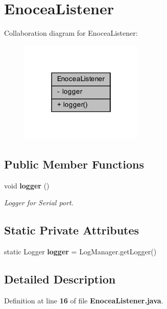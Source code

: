 \section{Enocea\+Listener}
\label{classch_1_1bfh_1_1gr33nopo55um_1_1enocean_1_1application_1_1EnoceaListener}


Collaboration diagram for Enocea\+Listener\+:\nopagebreak
\begin{figure}[H]
\begin{center}
\leavevmode
\includegraphics[width=166pt]{dc/d46/classch_1_1bfh_1_1gr33nopo55um_1_1enocean_1_1application_1_1EnoceaListener__coll__graph}
\end{center}
\end{figure}
\subsection*{Public Member Functions}
\begin{DoxyCompactItemize}
\item 
void {\bf logger} ()
\begin{DoxyCompactList}\small\item\em Logger for Serial port. \end{DoxyCompactList}\end{DoxyCompactItemize}
\subsection*{Static Private Attributes}
\begin{DoxyCompactItemize}
\item 
static Logger {\bf logger} = Log\+Manager.\+get\+Logger()
\end{DoxyCompactItemize}


\subsection{Detailed Description}


Definition at line {\bf 16} of file {\bf Enocea\+Listener.\+java}.



